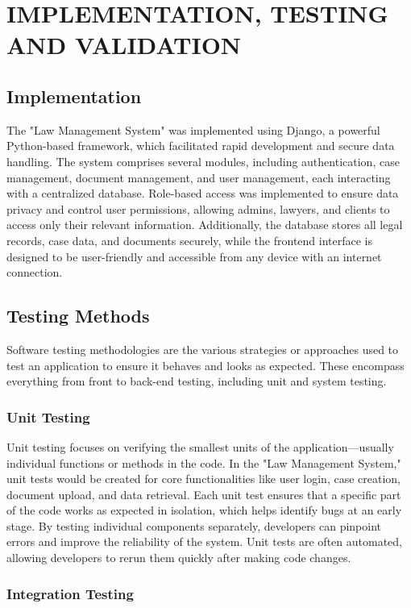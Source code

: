 \chapter{IMPLEMENTATION, TESTING AND VALIDATION}
%
\section{Implementation}

The "Law Management System" was implemented using Django, a powerful Python-based framework, which facilitated rapid development and secure data handling. The system comprises several modules, including authentication, case management, document management, and user management, each interacting with a centralized database. Role-based access was implemented to ensure data privacy and control user permissions, allowing admins, lawyers, and clients to access only their relevant information. Additionally, the database stores all legal records, case data, and documents securely, while the frontend interface is designed to be user-friendly and accessible from any device with an internet connection.
\section{Testing Methods}

Software testing methodologies are the various strategies or approaches used to test an application to ensure it behaves and looks as expected. These encompass everything from front to back-end testing, including unit and system testing.

\subsection{Unit Testing}

Unit testing focuses on verifying the smallest units of the application—usually individual functions or methods in the code. In the "Law Management System," unit tests would be created for core functionalities like user login, case creation, document upload, and data retrieval. Each unit test ensures that a specific part of the code works as expected in isolation, which helps identify bugs at an early stage. By testing individual components separately, developers can pinpoint errors and improve the reliability of the system. Unit tests are often automated, allowing developers to rerun them quickly after making code changes.

\subsection{Integration Testing}

